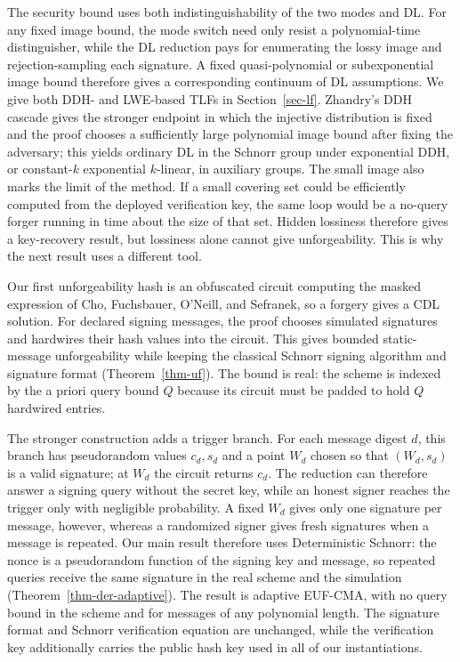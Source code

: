 The security bound uses both indistinguishability of the two modes and DL. For any fixed image bound, the mode switch need only resist a polynomial-time distinguisher, while the DL reduction pays for enumerating the lossy image and rejection-sampling each signature. A fixed quasi-polynomial or subexponential image bound therefore gives a corresponding continuum of DL assumptions. We give both DDH- and LWE-based TLFs in Section~\ref{sec-lf}. Zhandry's DDH cascade gives the stronger endpoint in which the injective distribution is fixed and the proof chooses a sufficiently large polynomial image bound after fixing the adversary; this yields ordinary DL in the Schnorr group under exponential DDH, or constant-$k$ exponential $k$-linear, in auxiliary groups. The small image also marks the limit of the method. If a small covering set could be efficiently computed from the deployed verification key, the same loop would be a no-query forger running in time about the size of that set. Hidden lossiness therefore gives a key-recovery result, but lossiness alone cannot give unforgeability. This is why the next result uses a different tool.

 Our first unforgeability hash is an obfuscated circuit computing the masked expression of Cho, Fuchsbauer, O'Neill, and Sefranek, so a forgery gives a CDL solution. For declared signing messages, the proof chooses simulated signatures and hardwires their hash values into the circuit. This gives bounded static-message unforgeability while keeping the classical Schnorr signing algorithm and signature format (Theorem~\ref{thm-uf}). The bound is real: the scheme is indexed by the a priori query bound $Q$ because its circuit must be padded to hold $Q$ hardwired entries.

The stronger construction adds a trigger branch. For each message digest $d$, this branch has pseudorandom values $c_d,s_d$ and a point $W_d$ chosen so that $(W_d,s_d)$ is a valid signature; at $W_d$ the circuit returns $c_d$. The reduction can therefore answer a signing query without the secret key, while an honest signer reaches the trigger only with negligible probability. A fixed $W_d$ gives only one signature per message, however, whereas a randomized signer gives fresh signatures when a message is repeated. Our main result therefore uses Deterministic Schnorr: the nonce is a pseudorandom function of the signing key and message, so repeated queries receive the same signature in the real scheme and the simulation (Theorem~\ref{thm-der-adaptive}). The result is adaptive EUF-CMA, with no query bound in the scheme and for messages of any polynomial length. The signature format and Schnorr verification equation are unchanged, while the verification key additionally carries the public hash key used in all of our instantiations.

